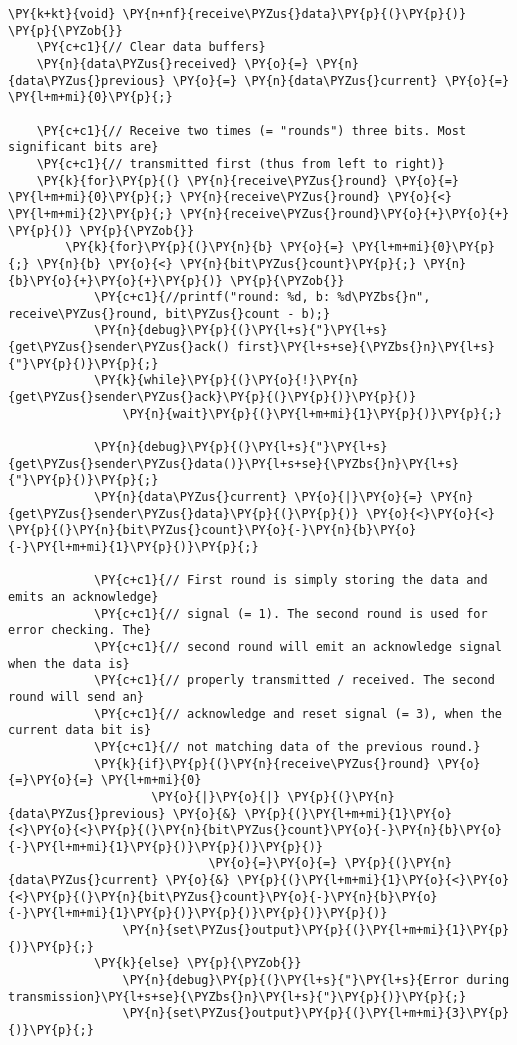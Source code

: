 \begin{Verbatim}[commandchars=\\\{\}]
\PY{k+kt}{void} \PY{n+nf}{receive\PYZus{}data}\PY{p}{(}\PY{p}{)} \PY{p}{\PYZob{}}
    \PY{c+c1}{// Clear data buffers}
    \PY{n}{data\PYZus{}received} \PY{o}{=} \PY{n}{data\PYZus{}previous} \PY{o}{=} \PY{n}{data\PYZus{}current} \PY{o}{=} \PY{l+m+mi}{0}\PY{p}{;}

    \PY{c+c1}{// Receive two times (= "rounds") three bits. Most significant bits are}
    \PY{c+c1}{// transmitted first (thus from left to right)}
    \PY{k}{for}\PY{p}{(} \PY{n}{receive\PYZus{}round} \PY{o}{=} \PY{l+m+mi}{0}\PY{p}{;} \PY{n}{receive\PYZus{}round} \PY{o}{<} \PY{l+m+mi}{2}\PY{p}{;} \PY{n}{receive\PYZus{}round}\PY{o}{+}\PY{o}{+} \PY{p}{)} \PY{p}{\PYZob{}}
        \PY{k}{for}\PY{p}{(}\PY{n}{b} \PY{o}{=} \PY{l+m+mi}{0}\PY{p}{;} \PY{n}{b} \PY{o}{<} \PY{n}{bit\PYZus{}count}\PY{p}{;} \PY{n}{b}\PY{o}{+}\PY{o}{+}\PY{p}{)} \PY{p}{\PYZob{}}
            \PY{c+c1}{//printf("round: %d, b: %d\PYZbs{}n", receive\PYZus{}round, bit\PYZus{}count - b);}
            \PY{n}{debug}\PY{p}{(}\PY{l+s}{"}\PY{l+s}{get\PYZus{}sender\PYZus{}ack() first}\PY{l+s+se}{\PYZbs{}n}\PY{l+s}{"}\PY{p}{)}\PY{p}{;}
            \PY{k}{while}\PY{p}{(}\PY{o}{!}\PY{n}{get\PYZus{}sender\PYZus{}ack}\PY{p}{(}\PY{p}{)}\PY{p}{)}
                \PY{n}{wait}\PY{p}{(}\PY{l+m+mi}{1}\PY{p}{)}\PY{p}{;}

            \PY{n}{debug}\PY{p}{(}\PY{l+s}{"}\PY{l+s}{get\PYZus{}sender\PYZus{}data()}\PY{l+s+se}{\PYZbs{}n}\PY{l+s}{"}\PY{p}{)}\PY{p}{;}
            \PY{n}{data\PYZus{}current} \PY{o}{|}\PY{o}{=} \PY{n}{get\PYZus{}sender\PYZus{}data}\PY{p}{(}\PY{p}{)} \PY{o}{<}\PY{o}{<} \PY{p}{(}\PY{n}{bit\PYZus{}count}\PY{o}{-}\PY{n}{b}\PY{o}{-}\PY{l+m+mi}{1}\PY{p}{)}\PY{p}{;}

            \PY{c+c1}{// First round is simply storing the data and emits an acknowledge}
            \PY{c+c1}{// signal (= 1). The second round is used for error checking. The}
            \PY{c+c1}{// second round will emit an acknowledge signal when the data is}
            \PY{c+c1}{// properly transmitted / received. The second round will send an}
            \PY{c+c1}{// acknowledge and reset signal (= 3), when the current data bit is}
            \PY{c+c1}{// not matching data of the previous round.}
            \PY{k}{if}\PY{p}{(}\PY{n}{receive\PYZus{}round} \PY{o}{=}\PY{o}{=} \PY{l+m+mi}{0}
                    \PY{o}{|}\PY{o}{|} \PY{p}{(}\PY{n}{data\PYZus{}previous} \PY{o}{&} \PY{p}{(}\PY{l+m+mi}{1}\PY{o}{<}\PY{o}{<}\PY{p}{(}\PY{n}{bit\PYZus{}count}\PY{o}{-}\PY{n}{b}\PY{o}{-}\PY{l+m+mi}{1}\PY{p}{)}\PY{p}{)}\PY{p}{)}
                            \PY{o}{=}\PY{o}{=} \PY{p}{(}\PY{n}{data\PYZus{}current} \PY{o}{&} \PY{p}{(}\PY{l+m+mi}{1}\PY{o}{<}\PY{o}{<}\PY{p}{(}\PY{n}{bit\PYZus{}count}\PY{o}{-}\PY{n}{b}\PY{o}{-}\PY{l+m+mi}{1}\PY{p}{)}\PY{p}{)}\PY{p}{)}\PY{p}{)}
                \PY{n}{set\PYZus{}output}\PY{p}{(}\PY{l+m+mi}{1}\PY{p}{)}\PY{p}{;}
            \PY{k}{else} \PY{p}{\PYZob{}}
                \PY{n}{debug}\PY{p}{(}\PY{l+s}{"}\PY{l+s}{Error during transmission}\PY{l+s+se}{\PYZbs{}n}\PY{l+s}{"}\PY{p}{)}\PY{p}{;}
                \PY{n}{set\PYZus{}output}\PY{p}{(}\PY{l+m+mi}{3}\PY{p}{)}\PY{p}{;}


\end{Verbatim}
